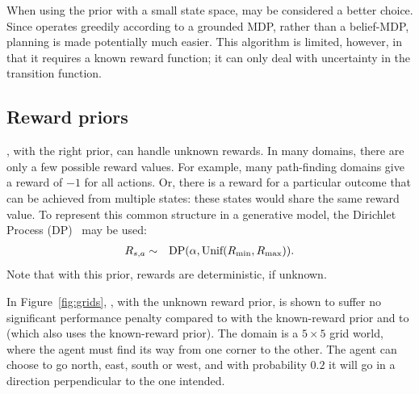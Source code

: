 
When using the  prior with a small state space,  may be considered a better choice. Since  operates greedily according to a grounded MDP, rather than a belief-MDP,  planning is made potentially much easier. This algorithm is limited, however, in that it requires a known reward function; it can only deal with uncertainty in the transition function.

\subsection{Reward priors}

, with the right prior, can handle unknown rewards. In many domains, there are only a few possible reward values. For example, many path-finding domains give a reward of $-1$ for all actions. Or, there is a reward for a particular outcome that can be achieved from multiple states: these states would share the same reward value.  To represent this common structure in a generative model, the Dirichlet Process (DP)~\cite{maceachern98} may be used:
\begin{eqnarray*}
R_{s,a} &\sim& \mbox{DP}(\alpha, \mbox{Unif}(R_{\rm min}, R_{\rm max})).
\end{eqnarray*}
Note that with this prior, rewards are deterministic, if unknown.

In Figure~\ref{fig:grids}, , with the unknown reward prior, is shown to suffer no significant performance penalty compared to  with the known-reward prior and to  (which also uses the known-reward prior). The domain is a $5\times 5$ grid world, where the agent must find its way from one corner to the other. The agent can choose to go north, east, south or west, and with probability $0.2$ it will go in a direction perpendicular to the one intended.



